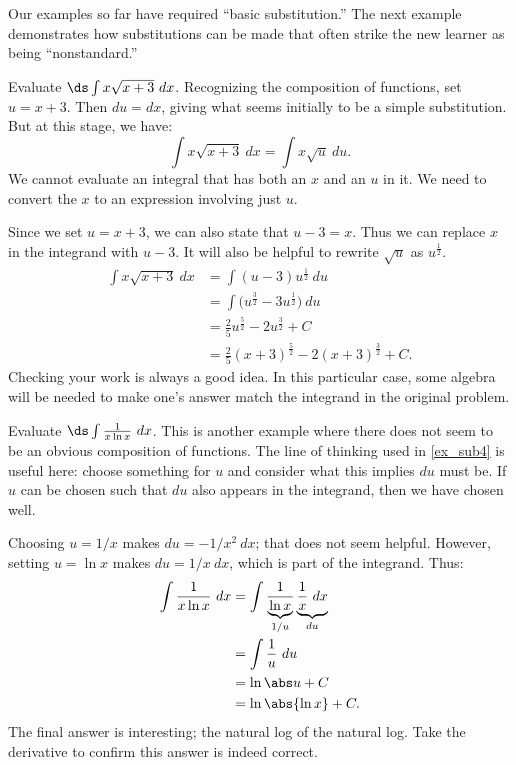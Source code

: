 Our examples so far have required ``basic substitution.'' The next example demonstrates how substitutions can be made that often strike the new learner as being ``nonstandard.''

\begin{example}\label{ex_sub4}
Evaluate $\ds\int x\sqrt{x+3}\ dx$.
\solution
Recognizing the composition of functions, set $u = x+3$. Then $du = dx$, giving what seems initially to be a simple substitution. But at this stage, we have:\vspace{-.3\baselineskip}
	\[\int x\sqrt{x+3}\ dx = \int x\sqrt{u}\ du.\]
We cannot evaluate an integral that has both an $x$ and an $u$ in it. We need to convert the $x$ to an expression involving just $u$.

Since we set $u = x+3$, we can also state that $u-3 = x$. Thus we can replace $x$ in the integrand with $u-3$. It will also be helpful to rewrite $\sqrt{u}$ as $u^\frac12$.
\begin{align*}
	\int x\sqrt{x+3} \ dx
	&= \int (u-3)u^\frac12\ du \\
	&= \int \bigl(u^\frac32 - 3u^\frac12\bigr) \ du \\
	&= \frac25u^\frac52 - 2u^\frac32 + C \\
	&= \frac25(x+3)^\frac52 - 2(x+3)^\frac32 + C.
\end{align*}
Checking your work is always a good idea. In this particular case, some algebra will be needed to make one's answer match the integrand in the original problem.
\end{example}

\begin{example}\label{ex_sub5}
Evaluate $\ds \int \frac{1}{x\ln x}\ dx$.
\solution
This is another example where there does not seem to be an obvious composition of functions. The line of thinking used in \autoref{ex_sub4} is useful here: choose something for $u$ and consider what this implies $du$ must be. If $u$ can be chosen such that $du$ also appears in the integrand, then we have chosen well.

Choosing $u = 1/x$ makes $du = -1/x^2\ dx$; that does not seem helpful. However, setting $u = \ln x$ makes $du = 1/x\ dx$, which is part of the integrand. Thus:
\begin{align*}
	\int \frac1{x\ln x}\ dx
	&= \int \frac{1}{\underbrace{\ln x}_{1/u}}\underbrace{\frac1x\ dx}_{du} \\
	&= \int \frac1u\ du \\
	&= \ln \abs u + C \\
	&= \ln \abs{\ln x} + C.
\end{align*}
The final answer is interesting; the natural log of the natural log. Take the derivative to confirm this answer is indeed correct.
\end{example}

